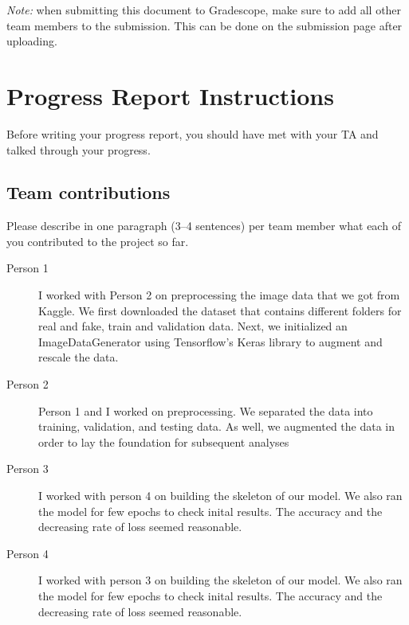 \emph{Note:} when submitting this document to Gradescope, make sure to add all other team members to the submission. This can be done on the submission page after uploading.

\section*{Progress Report Instructions}

Before writing your progress report, you should have met with your TA and talked through your progress.

\subsection*{Team contributions}

Please describe in one paragraph (3--4 sentences) per team member what each of you contributed to the project so far.
\begin{description}
\item[Person 1] I worked with Person 2 on preprocessing the image data that we got from Kaggle. We first downloaded the dataset that contains different folders for real and fake, train and validation data. Next, we initialized an ImageDataGenerator using Tensorflow's Keras library to augment and rescale the data. 
\item[Person 2] Person 1 and I worked on preprocessing. We separated the data into training, validation, and testing data. As well, we augmented the data in order to lay the foundation for subsequent analyses
\item [Person 3] I worked with person 4 on building the skeleton of our model. We also ran the model for few epochs to check inital results. The accuracy and the decreasing rate of loss seemed reasonable.
\item [Person 4] I worked with person 3 on building the skeleton of our model. We also ran the model for few epochs to check inital results. The accuracy and the decreasing rate of loss seemed reasonable.
\end{description}

